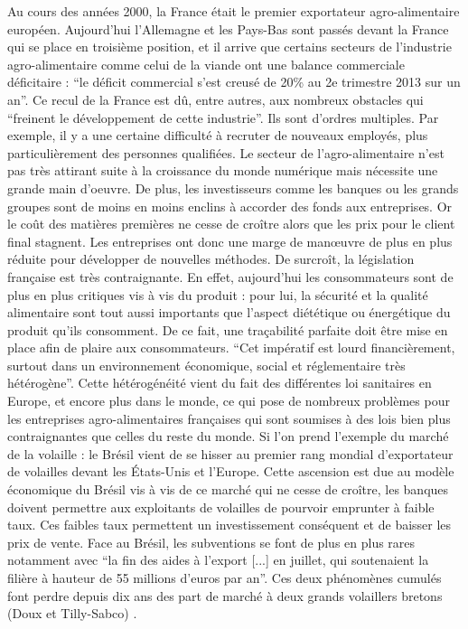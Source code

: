 \documentclass[a4paper,10pt]{report}
\begin{document}
			Au cours des années 2000, la France était le premier exportateur agro-alimentaire européen. Aujourd'hui l’Allemagne et les Pays-Bas sont passés devant la France qui se place en troisième position, et il arrive que certains secteurs de l’industrie agro-alimentaire comme celui de la viande ont une balance commerciale déficitaire : “le déficit commercial s'est creusé de 20\% au 2e trimestre 2013 sur un an”\cite{DeficitCommercialViandeAggrave}.
			Ce recul de la France est dû, entre autres, aux nombreux obstacles qui “freinent le développement de cette industrie”\cite{StimulerCompetitiviteEntreprises}. Ils sont d’ordres multiples. Par exemple, il y a une certaine difficulté à recruter de nouveaux employés, plus particulièrement des personnes qualifiées. Le secteur de l’agro-alimentaire n’est pas très attirant suite à la croissance du monde numérique mais nécessite une grande main d’oeuvre.
			De plus, les investisseurs comme les banques ou les grands groupes sont de moins en moins enclins à accorder des fonds aux entreprises. Or le coût des matières premières ne cesse de croître alors que les prix pour le client final stagnent. Les entreprises ont donc une marge de manœuvre de plus en plus réduite pour développer de nouvelles méthodes. De surcroît, la législation française est très contraignante. En effet, aujourd’hui les consommateurs sont de plus en plus critiques vis à vis du produit : pour lui, la sécurité et la qualité alimentaire sont tout aussi importants que l’aspect diététique ou énergétique du produit qu’ils consomment. De ce fait, une traçabilité parfaite doit être mise en place afin de plaire aux consommateurs. “Cet impératif est lourd financièrement, surtout dans un environnement économique, social et réglementaire très hétérogène”\cite{SecteurAAFrancaisEnjeuxXXISiecle}. Cette hétérogénéité vient du fait des différentes loi sanitaires en Europe, et encore plus dans le monde, ce qui pose de nombreux problèmes pour les entreprises agro-alimentaires françaises qui sont soumises à des lois bien plus contraignantes que celles du reste du monde. Si l’on prend l’exemple du marché de la volaille : le Brésil vient de se hisser au premier rang mondial d’exportateur de volailles devant les États-Unis et l’Europe. Cette ascension est due au modèle économique du Brésil vis à vis de ce marché qui ne cesse de croître, les banques doivent permettre aux exploitants de volailles de pourvoir emprunter à faible taux. Ces faibles taux permettent un investissement conséquent et de baisser les prix de vente. Face au Brésil, les subventions se font de plus en plus rares notamment avec “la fin des aides à l'export [...] en juillet, qui soutenaient la filière à hauteur de 55 millions d'euros par an”.\cite{PouletBresilienMoinsCherBreton} Ces deux phénomènes cumulés font perdre depuis dix ans des part de marché à deux grands volaillers bretons (Doux et Tilly-Sabco) .
			
\end{document}

